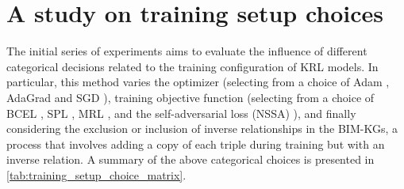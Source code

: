 \section{A study on training setup choices}\label{sec: training setup choices}
The initial series of experiments aims to evaluate the influence of different categorical decisions related to the training configuration of \ac{KRL} models. In particular, this method varies the optimizer (selecting from a choice of Adam \citep{Kingma2014Adam:Optimization}, AdaGrad \citep{DuchiJohn2011AdaptiveOptimization} and \ac{SGD} \citep{Bottou1998OnlineApproximations}), training objective function (selecting from a choice of \ac{BCEL} \citep{Dettmers2017ConvolutionalEmbeddings}, \ac{SPL} \citep{Glorot2011DeepNetworks}, \ac{MRL} \citep{Bordes2013}, and the self-adversarial loss (NSSA) \citep{Sun2019RotatE:Space}), and finally considering the exclusion or inclusion of inverse relationships in the \ac{BIM-KG}s, a process that involves adding a copy of each triple during training but with an inverse relation.
A summary of the above categorical choices is presented in \autoref{tab:training_setup_choice_matrix}. 

